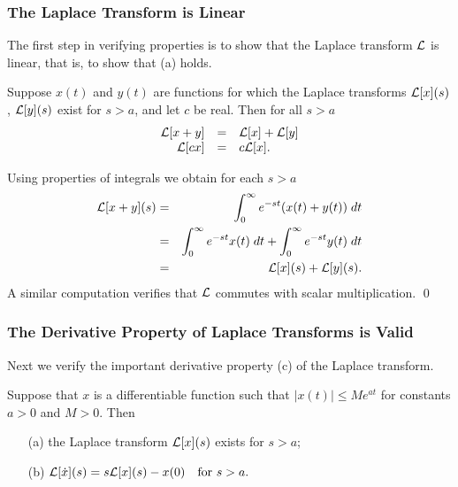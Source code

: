 \documentclass{ximera}
\begin{document}
\subsubsection*{The Laplace Transform is Linear}

The first step in verifying properties  is to show that the 
Laplace transform ${\cal L}$ is linear, that is, to 
show that (a) holds.
\begin{prop}  \label{prop:linLap}
Suppose $x(t)$ and $y(t)$ are functions for which the Laplace transforms
${\cal L}[x](s)$, ${\cal L}[y](s)$ exist for $s>a$, and let $c$ be real. 
Then for all $s>a$
\begin{equation}  \label{eq:linLap}
\begin{array}{rcl}
{\cal L}[x + y] &  = & {\cal L}[x] + {\cal L}[y] \\
{\cal L}[cx] & = & c{\cal L}[x].
\end{array}
\end{equation}
\end{prop}

\proof Using properties of integrals we obtain for each $s>a$
\begin{eqnarray*}
{\cal L}[x+y](s) &=& \int_0^{\infty} e^{-st} (x(t)+y(t))\; dt\\
&=& \int_0^{\infty} e^{-st} x(t)\; dt + \int_0^{\infty} e^{-st} y(t)\; dt\\
&=& {\cal L}[x](s)+ {\cal L}[y](s).
\end{eqnarray*}
A similar computation verifies that ${\cal L}$ commutes with scalar 
multiplication.  \qed

\subsubsection*{The Derivative Property of Laplace Transforms is Valid}

Next we verify the important derivative property (c) of the 
Laplace transform.  

\begin{prop}  \label{prop:derLap}
Suppose that $x$ is a differentiable function such that 
$|x(t)|\le Me^{at}$ for constants $a>0$ and $M>0$.  
Then
\begin{itemize}
\item[(a)] the Laplace transform ${\cal L}[x](s)$ exists for $s>a$; 
\item[(b)] ${\cal L}[\dot x](s) = s{\cal L}[x](s) - x(0) \quad 
\mbox{for $s>a$.}$
\end{itemize}
\end{prop}
\end{document}
